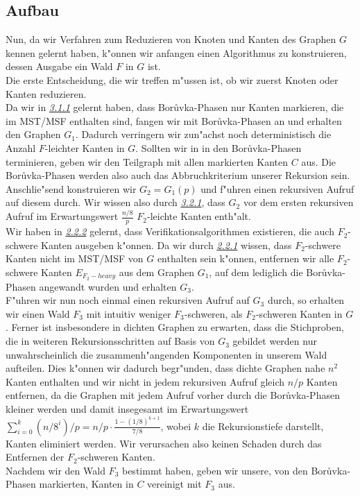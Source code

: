 \subsection{Aufbau}
Nun, da wir Verfahren zum Reduzieren von Knoten und Kanten des Graphen $G$ kennen
    gelernt haben, k"onnen wir anfangen einen Algorithmus zu konstruieren,
    dessen Ausgabe ein Wald $F$ in $G$ ist.\\
Die erste Entscheidung, die wir treffen m"ussen ist, ob wir zuerst Knoten oder Kanten
    reduzieren. \\
Da wir in \hyperref[sec:borIdea]{\textit{3.1.1}} gelernt haben, dass
    Bor\r uvka-Phasen nur Kanten markieren, die im MST/MSF 
    enthalten sind, fangen wir mit Bor\r uvka-Phasen an und erhalten den Graphen 
    $G_1$.
    Dadurch verringern wir
    zun"achst noch deterministisch die Anzahl $F$-leichter Kanten in $G$.
    Sollten wir in in den Bor\r uvka-Phasen terminieren, geben wir den Teilgraph
    mit allen markierten Kanten $C$ aus.
    Die Bor\r uvka-Phasen werden also auch das Abbruchkriterium unserer
    Rekursion sein.\\
Anschlie"send konstruieren wir $G_2 = G_1(p)$ und f"uhren einen rekursiven
    Aufruf auf diesem durch. 
    Wir wissen also durch \hyperref[sec:goodnessRand]{\textit{3.2.1}}, 
    dass $G_2$ vor dem ersten rekursiven Aufruf im Erwartungswert
    $\frac{n/8}{p}$ $F_2$-leichte Kanten enth"alt.\\
Wir haben in \hyperref[sec:verification]{\textit{2.2.2}} gelernt, dass
    Verifikationsalgorithmen existieren, die auch $F_2$-schwere Kanten ausgeben
    k"onnen.
    Da wir durch \hyperref[sec:fProof]{\textit{2.2.1}} wissen, dass $F_2$-schwere Kanten nicht im MST/MSF von $G$
    enthalten sein k"onnen, entfernen wir alle $F_2$-schwere Kanten $E_{F_2-heavy}$
    aus dem Graphen $G_1$,
    auf dem lediglich die Bor\r uvka-Phasen angewandt wurden und erhalten $G_3$.\\
F"uhren wir nun noch einmal einen rekursiven Aufruf auf $G_3$ durch, 
    so erhalten wir 
    einen Wald $F_3$ mit intuitiv weniger $F_3$-schweren, als $F_2$-schweren Kanten in $G$.
    Ferner ist insbesondere in dichten Graphen zu erwarten, dass die Stichproben, 
    die in weiteren Rekursionsschritten auf Basis von $G_3$ gebildet werden 
    nur unwahrscheinlich die zusammenh"angenden Komponenten in unserem Wald
    aufteilen. 
    Dies k"onnen wir dadurch begr"unden, dass dichte Graphen nahe $n^2$ Kanten
    enthalten und wir nicht in jedem rekursiven Aufruf gleich $n/p$ Kanten 
    entfernen, da die Graphen mit jedem Aufruf vorher durch die Bor\r uvka-Phasen
    kleiner werden und damit insegesamt im Erwartungswert 
    $\sum_{i=0}^k (n/8^i)/p = n/p \cdot \frac{1-(1/8)^{k+1}}{7/8}$, wobei $k$
    die Rekursionstiefe darstellt, Kanten eliminiert werden.
    Wir verursachen also keinen Schaden durch das Entfernen der $F_2$-schweren
    Kanten.\\
Nachdem wir den Wald $F_3$ bestimmt haben, geben wir unsere, von den Bor\r uvka-Phasen
    markierten, Kanten in $C$ vereinigt mit $F_3$ aus.\\

